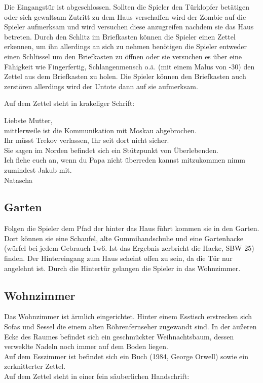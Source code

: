 Die Eingangstür ist abgeschlossen. Sollten die Spieler den Türklopfer betätigen oder sich gewaltsam Zutritt zu dem Haus verschaffen wird der Zombie auf die Spieler aufmerksam und wird versuchen diese anzugreifen nachdem sie das Haus betreten. Durch den Schlitz im Briefkasten können die Spieler einen Zettel erkennen, um ihn allerdings an sich zu nehmen benötigen die Spieler entweder einen Schlüssel um den Briefkasten zu öffnen oder sie versuchen es über eine Fähigkeit wie Fingerfertig, Schlangenmensch o.ä. (mit einem Malus von -30) den Zettel aus dem Briefkasten zu holen. Die Spieler können den Briefkasten auch zerstören allerdings wird der Untote dann auf sie aufmerksam.

\newpage
Auf dem Zettel steht in krakeliger Schrift:

\begin{itshape}
	Liebste Mutter,
	\\mittlerweile ist die Kommunikation mit Moskau abgebrochen.
	\\Ihr müsst Trekov verlassen, Ihr seit dort nicht sicher.
	\\Sie sagen im Norden befindet sich ein Stützpunkt von Überlebenden.
	\\Ich flehe euch an, wenn du Papa nicht überreden kannst mitzukommen nimm zumindest Jakub mit.
	\\Natascha

\end{itshape}

\subsection{Garten}

Folgen die Spieler dem Pfad der hinter das Haus führt kommen sie in den Garten. Dort können sie eine Schaufel, alte Gummihandschuhe und eine Gartenhacke (würfel bei jedem Gebrauch 1w6. Ist das Ergebnis  zerbricht die Hacke, SBW 25) finden. Der Hintereingang zum Haus scheint offen zu sein, da die Tür nur angelehnt ist. Durch die Hintertür gelangen die Spieler in das Wohnzimmer.

\subsection{Wohnzimmer}

Das Wohnzimmer ist ärmlich eingerichtet. Hinter einem Esstisch erstrecken sich Sofas und Sessel die einem alten Röhrenfernseher zugewandt sind. In der äußeren Ecke des Raumes befindet sich ein geschmückter Weihnachtsbaum, dessen verweklte Nadeln noch immer auf dem Boden liegen.
\\Auf dem Esszimmer ist befindet sich ein Buch (1984, George Orwell) sowie ein zerknitterter Zettel.
\\Auf dem Zettel steht in einer fein säuberlichen Handschrift:

